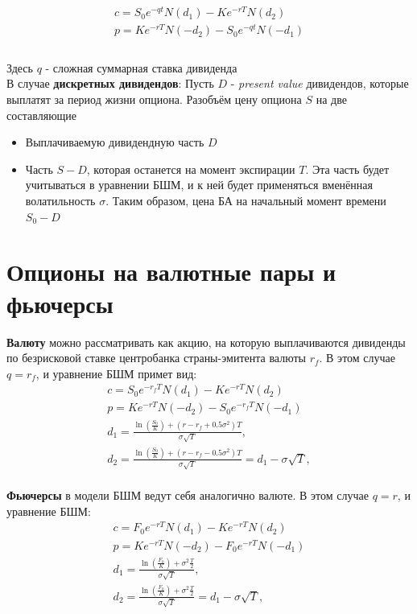 \documentclass{article}
\begin{document}
\begin{equation}
\begin{gathered}
c=S_0e^{-qt}N\left(d_1\right)-K e^{-r T} N\left(d_2\right) \\
p=K e^{-r T}N\left(-d_2\right)-S_0e^{-qt}N\left(-d_1\right) \\
\end{gathered}
\end{equation}\\
Здесь $q$ - сложная суммарная ставка дивиденда\\
В случае \textbf{дискретных дивидендов}: Пусть $D$ - \textit{present value} дивидендов, которые выплатят за период жизни опциона. Разобъём цену опциона $S$ на две составляющие
\begin{itemize}
    \item Выплачиваемую дивидендную часть $D$
    \item Часть $S-D$, которая останется на момент экспирации $T$. Эта часть будет учитываться в уравнении БШМ, и к ней будет применяться вменённая волатильность $\sigma$. Таким образом, цена БА на начальный момент времени $S_0-D$
\end{itemize}

\section{Опционы на валютные пары и фьючерсы}
\textbf{Валюту} можно рассматривать как акцию, на которую выплачиваются дивиденды по безрисковой ставке центробанка страны-эмитента валюты $r_f$. В этом случае $q=r_f$, и уравнение БШМ примет вид:
\begin{equation*}
\begin{gathered}
c=S_0 e^{-r_f T} N\left(d_1\right)-K e^{-r T} N\left(d_2\right) \\
p=K e^{-r T} N\left(-d_2\right)-S_0 e^{-r_f T} N\left(-d_1\right) \\
d_1=\frac{\ln \left(\frac{S_0}{K}\right)+\left(r-r_f+0.5 \sigma^2\right) T}{\sigma \sqrt{T}}, \\
d_2=\frac{\ln \left(\frac{S_0}{K}\right)+\left(r-r_f-0.5 \sigma^2\right) T}{\sigma \sqrt{T}}=d_1-\sigma \sqrt{T},
\end{gathered}
\end{equation*}\\
\textbf{Фьючерсы} в модели БШМ ведут себя аналогично валюте. В этом случае $q=r$, и уравнение БШМ:\\
\begin{equation*}
\begin{gathered}
c=F_0 e^{-r T} N\left(d_1\right)-K e^{-r T} N\left(d_2\right) \\
p=K e^{-r T} N\left(-d_2\right)-F_0 e^{-r T} N\left(-d_1\right) \\
d_1=\frac{\ln \left(\frac{F_0}{K}\right)+\sigma^2\frac{T}{2}}{\sigma \sqrt{T}}, \\
d_2=\frac{\ln \left(\frac{F_0}{K}\right)+\sigma^2\frac{T}{2}}{\sigma \sqrt{T}}=d_1-\sigma \sqrt{T},
\end{gathered}
\end{equation*}\\
\end{document}
